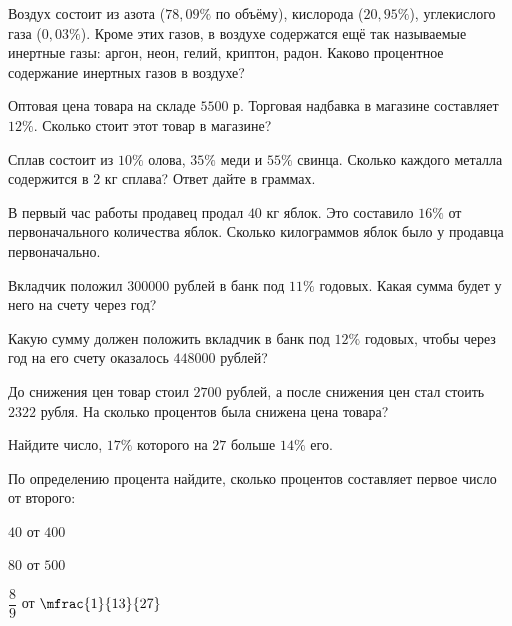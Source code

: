 %
%
\begin{class}[number=3]
	\begin{listofex}
		\item Воздух состоит из азота (\( 78,09\% \) по объёму), кислорода (\( 20,95\% \)), углекислого газа (\( 0,03\% \)). Кроме этих газов, в воздухе содержатся ещё так называемые инертные газы: аргон, неон, гелий, криптон, радон. Каково процентное содержание инертных газов в воздухе?
		\item Оптовая цена товара на складе \( 5500 \) р. Торговая надбавка в магазине составляет \( 12\% \). Сколько стоит этот товар в магазине?
		\item Сплав состоит из \( 10\% \) олова, \( 35\% \) меди и \( 55\% \) свинца. Сколько каждого металла содержится в \( 2 \) кг сплава? Ответ дайте в граммах.
		\item В первый час работы продавец продал \( 40 \) кг яблок. Это составило \( 16\% \) от первоначального количества яблок. Сколько килограммов яблок было у продавца первоначально.
		\item Вкладчик положил \( 300000 \) рублей в банк под \( 11\% \) годовых. Какая сумма будет у него на счету через год?
		\item Какую сумму должен положить вкладчик в банк под \( 12\% \) годовых, чтобы через год на его счету оказалось \( 448000 \) рублей?
		\item До снижения цен товар стоил \( 2700 \) рублей, а после снижения цен стал стоить \( 2322 \) рубля. На сколько процентов была снижена цена товара?
		\item Найдите число, \( 17\% \) которого на \( 27 \) больше \( 14\% \) его.
		\item По определению процента найдите, сколько процентов составляет первое число от второго:
		\begin{enumcols}[itemcolumns=3]
			\item \( 40 \) от \( 400 \)
			\item \( 80 \) от \( 500 \)
			\item \( \dfrac{8}{9} \) от \( \mfrac{1}{13}{27} \)
		\end{enumcols}
	\end{listofex}
\end{class}
%
